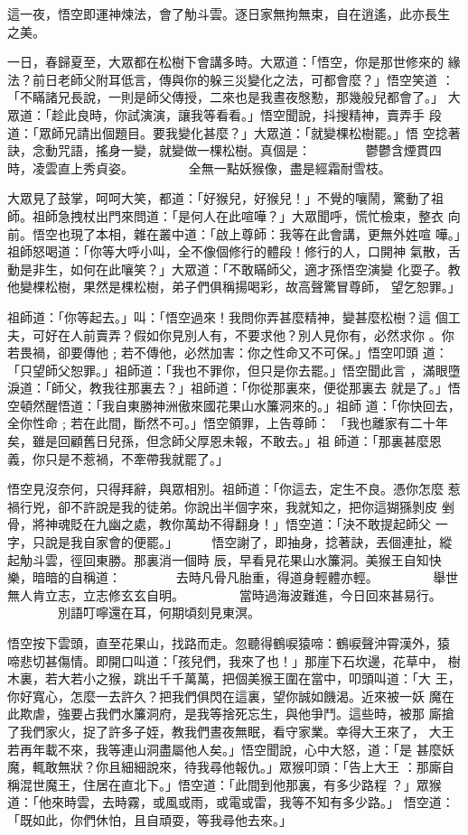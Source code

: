 \begin{pinyinscope}
{這一夜，悟空即運神煉法，會了觔斗雲。逐日家無拘無束，自在逍遙，此亦長生
之美。

一日，春歸夏至，大眾都在松樹下會講多時。大眾道：「悟空，你是那世修來的
緣法？前日老師父附耳低言，傳與你的躲三災變化之法，可都會麼？」悟空笑道
：「不瞞諸兄長說，一則是師父傳授，二來也是我晝夜慇懃，那幾般兒都會了。」
大眾道：「趁此良時，你試演演，讓我等看看。」悟空聞說，抖搜精神，賣弄手
段道：「眾師兄請出個題目。要我變化甚麼？」大眾道：「就變棵松樹罷。」悟
空捻著訣，念動咒語，搖身一變，就變做一棵松樹。真個是：
　　　　鬱鬱含煙貫四時，凌雲直上秀貞姿。
　　　　全無一點妖猴像，盡是經霜耐雪枝。

大眾見了鼓掌，呵呵大笑，都道：「好猴兒，好猴兒！」不覺的嚷鬧，驚動了祖
師。祖師急拽杖出門來問道：「是何人在此喧嘩？」大眾聞呼，慌忙檢束，整衣
向前。悟空也現了本相，雜在叢中道：「啟上尊師：我等在此會講，更無外姓喧
嘩。」祖師怒喝道：「你等大呼小叫，全不像個修行的體段！修行的人，口開神
氣散，舌動是非生，如何在此嚷笑？」大眾道：「不敢瞞師父，適才孫悟空演變
化耍子。教他變棵松樹，果然是棵松樹，弟子們俱稱揚喝彩，故高聲驚冒尊師，
望乞恕罪。」

祖師道：「你等起去。」叫：「悟空過來！我問你弄甚麼精神，變甚麼松樹？這
個工夫，可好在人前賣弄？假如你見別人有，不要求他？別人見你有，必然求你
。你若畏禍，卻要傳他﹔若不傳他，必然加害：你之性命又不可保。」悟空叩頭
道：「只望師父恕罪。」祖師道：「我也不罪你，但只是你去罷。」悟空聞此言
，滿眼墮淚道：「師父，教我往那裏去？」祖師道：「你從那裏來，便從那裏去
就是了。」悟空頓然醒悟道：「我自東勝神洲傲來國花果山水簾洞來的。」祖師
道：「你快回去，全你性命﹔若在此間，斷然不可。」悟空領罪，上告尊師：
「我也離家有二十年矣，雖是回顧舊日兒孫，但念師父厚恩未報，不敢去。」祖
師道：「那裏甚麼恩義，你只是不惹禍，不牽帶我就罷了。」

悟空見沒奈何，只得拜辭，與眾相別。祖師道：「你這去，定生不良。憑你怎麼
惹禍行兇，卻不許說是我的徒弟。你說出半個字來，我就知之，把你這猢猻剝皮
剉骨，將神魂貶在九幽之處，教你萬劫不得翻身！」悟空道：「決不敢提起師父
一字，只說是我自家會的便罷。」
　　
悟空謝了，即抽身，捻著訣，丟個連扯，縱起觔斗雲，徑回東勝。那裏消一個時
辰，早看見花果山水簾洞。美猴王自知快樂，暗暗的自稱道：
　　　　去時凡骨凡胎重，得道身輕體亦輕。
　　　　舉世無人肯立志，立志修玄玄自明。
　　　　當時過海波難進，今日回來甚易行。
　　　　別語叮嚀還在耳，何期頃刻見東溟。

悟空按下雲頭，直至花果山，找路而走。忽聽得鶴唳猿啼：鶴唳聲沖霄漢外，猿
啼悲切甚傷情。即開口叫道：「孩兒們，我來了也！」那崖下石坎邊，花草中，
樹木裏，若大若小之猴，跳出千千萬萬，把個美猴王圍在當中，叩頭叫道：「大
王，你好寬心，怎麼一去許久？把我們俱閃在這裏，望你誠如饑渴。近來被一妖
魔在此欺虐，強要占我們水簾洞府，是我等捨死忘生，與他爭鬥。這些時，被那
廝搶了我們家火，捉了許多子姪，教我們晝夜無眠，看守家業。幸得大王來了，
大王若再年載不來，我等連山洞盡屬他人矣。」悟空聞說，心中大怒，道：「是
甚麼妖魔，輒敢無狀？你且細細說來，待我尋他報仇。」眾猴叩頭：「告上大王
：那廝自稱混世魔王，住居在直北下。」悟空道：「此間到他那裏，有多少路程
？」眾猴道：「他來時雲，去時霧，或風或雨，或電或雷，我等不知有多少路。」
悟空道：「既如此，你們休怕，且自頑耍，等我尋他去來。」

}
\end{pinyinscope}
